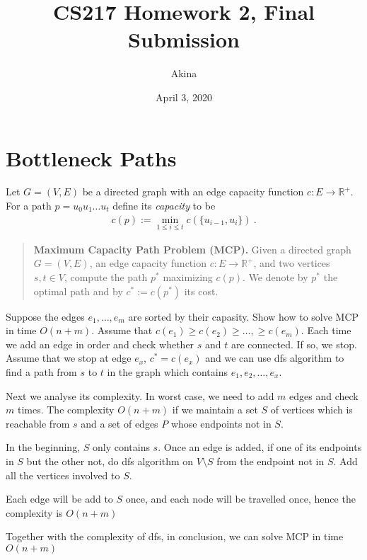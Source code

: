 \documentclass[11pt,a4paper,oneside]{article}
\newcommand{\R}{\mathbb{R}}
\renewcommand{\hwtitle} {CS217 Homework 2, Final Submission}
\renewcommand{\hwauthor}{Akina}
\renewcommand{\hwdate}{April 3, 2020}
\begin{document}
\title{\hwtitle}
\author{\hwauthor}
\date{\hwdate}
\maketitle

\section*{Bottleneck Paths}

Let $G=(V,E)$ be a directed graph with an edge capacity function $c: E \rightarrow \R^+$. For a path
$p = u_0 u_1 \dots u_t$ define its {\em capacity} to be
\begin{align}
c(p) := \min_{1 \leq i \leq t} c( \{u_{i-1}, u_i\}) \ .
\end{align}

\begin{quotation}
	\textbf{Maximum Capacity Path Problem (MCP).} Given a directed graph $G = (V,E)$, an edge capacity function
	$c: E \rightarrow \R^+$, and two vertices $s, t \in V$, compute the path $p^*$ maximizing $c(p)$. We
	denote by $p^*$ the optimal path and by $c^* := c(p^*)$ its cost. 
\end{quotation}

\begin{problem}{1}
	\statement
	Suppose the edges $e_1,\dots,e_m$ are sorted by their capasity. Show how to solve MCP in time $O(n+m)$.
	\solution
	Assume that \(c(e_1) \geq c(e_2) \geq \dots, \geq c(e_m)\). Each time we add an edge in order and check whether \(s\) and \(t\) are connected. If so, we stop. Assume that we stop at edge \(e_x\), \(c^* = c(e_x)\) and we can use dfs algorithm to find a path from \(s\) to \(t\) in the graph which contains \(e_1, e_2, \dots, e_x\).
	
	Next we analyse its complexity. In worst case, we need to add \(m\) edges and check \(m\) times. The complexity \(O(n + m)\) if we maintain a set \(S\) of vertices which is reachable from \(s\) and a set of edges \(P\) whose endpoints not in \(S\).
	
	In the beginning, \(S\) only contains \(s\). Once an edge is added, if one of its endpoints in \(S\) but the other not, do dfs algorithm on \(V \setminus S\) from the endpoint not in \(S\). Add all the vertices involved to \(S\).
	
	Each edge will be add to \(S\) once, and each node will be travelled once, hence the complexity is \(O(n + m)\)
	
	Together with the complexity of dfs, in conclusion, we can solve MCP in time \(O(n + m)\)
\end{problem}
\end{document}
